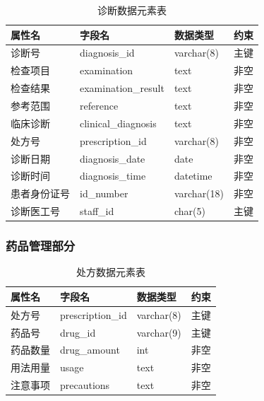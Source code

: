 \documentclass{article}
\begin{document}
\begin{table}[H]
    \centering
    \begin{tabularx}{\textwidth}{|>{\raggedright\arraybackslash}X|>{\raggedright\arraybackslash}X|>{\raggedright\arraybackslash}X|>{\raggedright\arraybackslash}X|}
    \toprule
    \textbf{属性名} & \textbf{字段名} & \textbf{数据类型} & \textbf{约束} \\ \midrule
    诊断号 & diagnosis\_id & varchar(8) & 主键 \\ \midrule
    检查项目 & examination & text & 非空 \\ \midrule
    检查结果 & examination\_result & text & 非空 \\ \midrule
    参考范围 & reference & text & 非空 \\ \midrule
    临床诊断 & clinical\_diagnosis & text & 非空 \\ \midrule
    处方号 & prescription\_id & varchar(8) & 非空 \\ \midrule
    诊断日期 & diagnosis\_date & date & 非空 \\ \midrule
    诊断时间 & diagnosis\_time & datetime & 非空 \\ \midrule
    患者身份证号 & id\_number & varchar(18) & 非空 \\ \midrule
    诊断医工号 & staff\_id & char(5) & 主键 \\ \bottomrule
    \end{tabularx}
    \caption{诊断数据元素表}
    \label{tab:diagnosis_elements}
\end{table}

\subsubsection{药品管理部分}

\begin{table}[H]
    \centering
    \begin{tabularx}{\textwidth}{|>{\raggedright\arraybackslash}X|>{\raggedright\arraybackslash}X|>{\raggedright\arraybackslash}X|>{\raggedright\arraybackslash}X|}
    \toprule
    \textbf{属性名} & \textbf{字段名} & \textbf{数据类型} & \textbf{约束} \\ \midrule
    处方号 & prescription\_id & varchar(8) & 主键 \\ \midrule
    药品号 & drug\_id & varchar(9) & 主键 \\ \midrule
    药品数量 & drug\_amount & int & 非空 \\ \midrule
    用法用量 & usage & text & 非空 \\ \midrule
    注意事项 & precautions & text & 非空 \\ \bottomrule
    \end{tabularx}
    \caption{处方数据元素表}
    \label{tab:prescription_elements}
\end{table}
\end{document}
